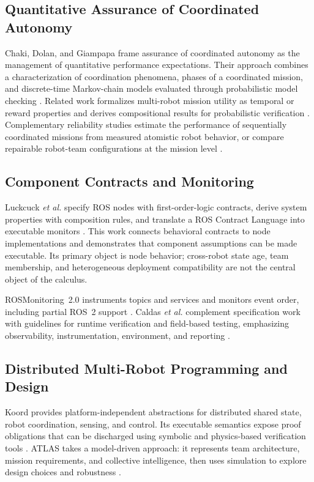 \subsection{Quantitative Assurance of Coordinated Autonomy}

Chaki, Dolan, and Giampapa frame assurance of coordinated autonomy as the
management of quantitative performance expectations.  Their approach combines
a characterization of coordination phenomena, phases of a coordinated mission,
and discrete-time Markov-chain models evaluated through probabilistic model
checking \cite{chaki2013assurance}.  Related work formalizes multi-robot mission
utility as temporal or reward properties and derives compositional results for
probabilistic verification \cite{chaki2013probabilistic}.  Complementary
reliability studies estimate the performance of sequentially coordinated
missions from measured atomistic robot behavior, or compare repairable
robot-team configurations at the mission level
\cite{porter2013reliability,stancliff2006missionreliability}.

\subsection{Component Contracts and Monitoring}

Luckcuck \emph{et al.} specify ROS nodes with first-order-logic contracts,
derive system properties with composition rules, and translate a ROS Contract
Language into executable monitors \cite{luckcuck2022compositional}.  This work
connects behavioral contracts to node implementations and demonstrates that
component assumptions can be made executable.  Its primary object is node
behavior; cross-robot state age, team membership, and heterogeneous deployment
compatibility are not the central object of the calculus.

ROSMonitoring~2.0 instruments topics and services and monitors event order,
including partial ROS~2 support \cite{ghaffari2024rosmonitoring}.  Caldas
\emph{et al.} complement specification work with guidelines for runtime
verification and field-based testing, emphasizing observability,
instrumentation, environment, and reporting \cite{caldas2024rvft}.

\subsection{Distributed Multi-Robot Programming and Design}

Koord provides platform-independent abstractions for distributed shared state,
robot coordination, sensing, and control.  Its executable semantics expose
proof obligations that can be discharged using symbolic and physics-based
verification tools \cite{ghosh2020koord}.  ATLAS takes a model-driven approach:
it represents team architecture, mission requirements, and collective
intelligence, then uses simulation to explore design choices and robustness
\cite{harbin2023design}.

